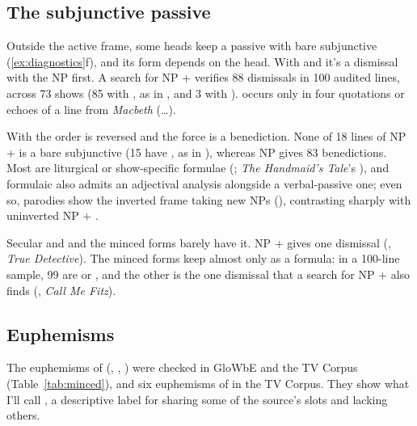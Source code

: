\documentclass[12pt]{article}
\begin{document}
\subsection{The subjunctive passive}
\label{sec:passive}

Outside the active frame, some heads keep a passive with bare subjunctive  (\ref{ex:diagnostics}f), and its form depends on the head. With  and  it's a dismissal with the NP first. A search for NP +  verifies 88 dismissals in 100 audited lines, across 73 shows (85 with , as in , and 3 with ).  occurs only in four quotations or echoes of a line from \emph{Macbeth} (\dots).

With  the order is reversed and the force is a benediction. None of 18 lines of NP +  is a bare subjunctive (15 have , as in ), whereas  NP gives 83 benedictions. Most are liturgical or show-specific formulae (; \emph{The Handmaid's Tale}'s ), and formulaic  also admits an adjectival analysis alongside a verbal-passive one; even so, parodies show the inverted frame taking new NPs (), contrasting sharply with uninverted NP + .

Secular  and  and the minced forms barely have it. NP +  gives one dismissal (, \emph{True Detective}). The minced forms keep  almost only as a formula: in a 100-line sample, 99 are  or , and the other is the one dismissal that a search for NP +  also finds (, \emph{Call Me Fitz}).

\subsection{Euphemisms}
\label{sec:minced}

The euphemisms of  (, , ) were checked in GloWbE and the TV Corpus (Table~\ref{tab:minced}), and six euphemisms of  in the TV Corpus. They show what I'll call , a descriptive label for sharing some of the source's slots and lacking others.
\end{document}
